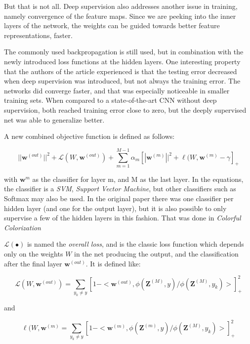 But that is not all. Deep supervision also addresses another issue in training, namely convergence of the feature maps. Since we are peeking into the inner layers of the network, the weights can be guided towards better feature representations, faster. 

The commonly used backpropagation is still used, but in combination with the newly introduced loss functions at the hidden layers. One interesting property that the authors of the article experienced is that the testing error decreased when deep supervision was introduced, but not always the training error. The networks did converge faster, and that was especially noticeable in smaller training sets. When compared to a state-of-the-art CNN without deep supervision, both reached training error close to zero, but the deeply supervised net was able to generalize better. 

A new combined objective function is defined as follows:

\begin{equation}
||\textbf{w}^{(out)}||^2 + \mathcal{L}(W, \textbf{w}^{(out)}) + \sum\limits_{m = 1}^{M - 1}\alpha_m[|\textbf{w}^{(m)}||^2 + \ell(W, \textbf{w}^{(m)} - \gamma]_+
\end{equation}

with $\textbf{w}^{m}$ as the classifier for layer m, and M as the last layer. In the equations, the classifier is a \emph{SVM}, \emph{Support Vector Machine}, but other classifiers such as Softmax may also be used. In the original paper there was one classifier per hidden layer (and one for the output layer), but it is also possible to only supervise a few of the hidden layers in this fashion. That was done in \emph{Colorful Colorization} %

$\mathcal{L}(\bullet)$ is named the \emph{overall loss}, and is the classic loss function which depends only on the weights $W$ in the net producing the output, and the classification after the final layer $\textbf{w}^{(out)}$. It is defined like:

\begin{equation}
\mathcal{L}(W, \textbf{w}^{(out)}) = \sum\limits_{y_k \neq y} [1 - < \textbf{w}^{(out)}, \phi(\textbf{Z}^{(M)}, y) / \phi(\textbf{Z}^{(M)}, y_k) >]^{2}_+
\end{equation}

and

\begin{equation}\label{eq:deep_loss}
\ell(W, \textbf{w}^{(m)} = \sum\limits_{y_k \neq y} [1 - < \textbf{w}^{(m)}, \phi(\textbf{Z}^{(m)}, y) / \phi(\textbf{Z}^{(M)}, y_k) >]^{2}_+
\end{equation}


